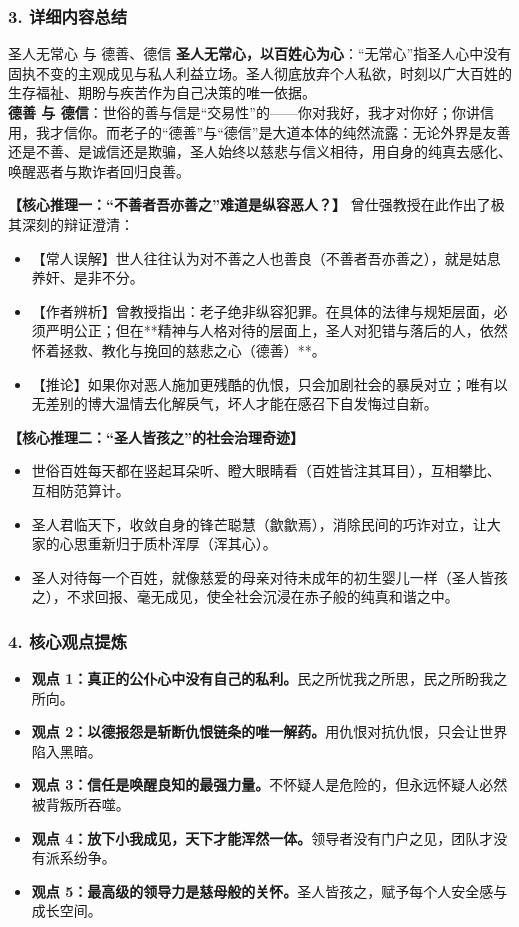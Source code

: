 \subsubsection{3. 详细内容总结}

\begin{ConceptBox}{圣人无常心 与 德善、德信}
\textbf{圣人无常心，以百姓心为心}：“无常心”指圣人心中没有固执不变的主观成见与私人利益立场。圣人彻底放弃个人私欲，时刻以广大百姓的生存福祉、期盼与疾苦作为自己决策的唯一依据。\\
\textbf{德善 与 德信}：世俗的善与信是“交易性”的——你对我好，我才对你好；你讲信用，我才信你。而老子的“德善”与“德信”是大道本体的纯然流露：无论外界是友善还是不善、是诚信还是欺骗，圣人始终以慈悲与信义相待，用自身的纯真去感化、唤醒恶者与欺诈者回归良善。
\end{ConceptBox}

\noindent\textbf{【核心推理一：“不善者吾亦善之”难道是纵容恶人？】}
曾仕强教授在此作出了极其深刻的辩证澄清：
\begin{itemize}
    \item 【常人误解】世人往往认为对不善之人也善良（不善者吾亦善之），就是姑息养奸、是非不分。
    \item 【作者辨析】曾教授指出：老子绝非纵容犯罪。在具体的法律与规矩层面，必须严明公正；但在**精神与人格对待的层面上，圣人对犯错与落后的人，依然怀着拯救、教化与挽回的慈悲之心（德善）**。
    \item 【推论】如果你对恶人施加更残酷的仇恨，只会加剧社会的暴戾对立；唯有以无差别的博大温情去化解戾气，坏人才能在感召下自发悔过自新。
\end{itemize}

\noindent\textbf{【核心推理二：“圣人皆孩之”的社会治理奇迹】}
\begin{itemize}
    \item 世俗百姓每天都在竖起耳朵听、瞪大眼睛看（百姓皆注其耳目），互相攀比、互相防范算计。
    \item 圣人君临天下，收敛自身的锋芒聪慧（歙歙焉），消除民间的巧诈对立，让大家的心思重新归于质朴浑厚（浑其心）。
    \item 圣人对待每一个百姓，就像慈爱的母亲对待未成年的初生婴儿一样（圣人皆孩之），不求回报、毫无成见，使全社会沉浸在赤子般的纯真和谐之中。
\end{itemize}

\subsubsection{4. 核心观点提炼}
\begin{itemize}
    \item \textbf{观点 1：真正的公仆心中没有自己的私利。}民之所忧我之所思，民之所盼我之所向。
    \item \textbf{观点 2：以德报怨是斩断仇恨链条的唯一解药。}用仇恨对抗仇恨，只会让世界陷入黑暗。
    \item \textbf{观点 3：信任是唤醒良知的最强力量。}不怀疑人是危险的，但永远怀疑人必然被背叛所吞噬。
    \item \textbf{观点 4：放下小我成见，天下才能浑然一体。}领导者没有门户之见，团队才没有派系纷争。
    \item \textbf{观点 5：最高级的领导力是慈母般的关怀。}圣人皆孩之，赋予每个人安全感与成长空间。
\end{itemize}

